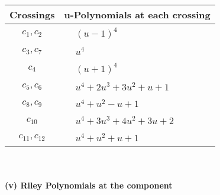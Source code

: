 \documentclass[1p]{elsarticle_modified}
\theoremstyle{definition}
\begin{document}
\begin{tabular}{m{50pt}|m{274pt}}
Crossings & \hspace{64pt}u-Polynomials at each crossing \\
\hline $$\begin{aligned}c_{1},c_{2}\end{aligned}$$&$\begin{aligned}
&(u-1)^4
\end{aligned}$\\
\hline $$\begin{aligned}c_{3},c_{7}\end{aligned}$$&$\begin{aligned}
&u^4
\end{aligned}$\\
\hline $$\begin{aligned}c_{4}\end{aligned}$$&$\begin{aligned}
&(u+1)^4
\end{aligned}$\\
\hline $$\begin{aligned}c_{5},c_{6}\end{aligned}$$&$\begin{aligned}
&u^4+2 u^3+3 u^2+u+1
\end{aligned}$\\
\hline $$\begin{aligned}c_{8},c_{9}\end{aligned}$$&$\begin{aligned}
&u^4+u^2- u+1
\end{aligned}$\\
\hline $$\begin{aligned}c_{10}\end{aligned}$$&$\begin{aligned}
&u^4+3 u^3+4 u^2+3 u+2
\end{aligned}$\\
\hline $$\begin{aligned}c_{11},c_{12}\end{aligned}$$&$\begin{aligned}
&u^4+u^2+u+1
\end{aligned}$\\
\hline
\end{tabular}\\~\\
\newpage\renewcommand{\arraystretch}{1}
\flushleft \textbf{(v) Riley Polynomials at the component}\newline \\
\end{document}
